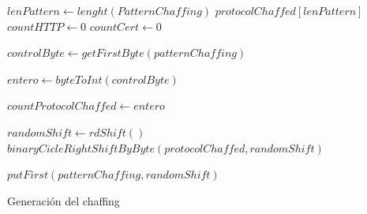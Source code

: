 \documentclass[12pt, a4paper, titlepage]{report}
\begin{document}
            \newpage
            
            \begin{algorithm}[H]
                \SetAlgoLined
                
                $lenPattern \longleftarrow lenght(PatternChaffing)$\;
                $protocolChaffed[lenPattern]$
                $countHTTP \longleftarrow 0$\;
                $countCert \longleftarrow 0$\;
                
                $controlByte \longleftarrow getFirstByte(patternChaffing)$\;
                
                $entero \longleftarrow byteToInt(controlByte)$\;
                
                $countProtocolChaffed \longleftarrow entero$\;
                
                $randomShift \longleftarrow rdShift()$\;
                $binaryCicleRightShiftByByte(protocolChaffed, randomShift)$\;
                
                $putFirst(patternChaffing, randomShift)$\;
                
                \caption{Generación del chaffing}
            \end{algorithm}
		    
\end{document}
